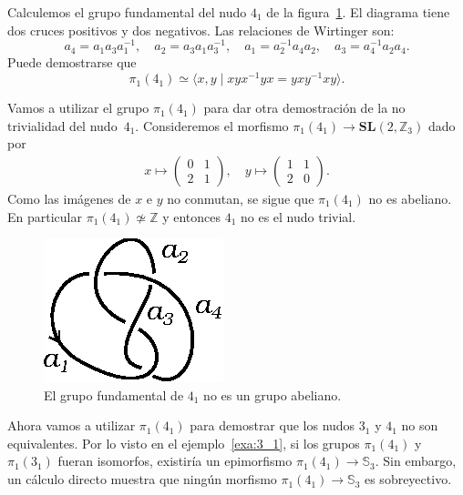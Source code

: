 \documentclass[graybox]{svmult}
\newcommand{\Z}{\mathbb{Z}}
\newcommand{\SL}{\mathbf{SL}}
\newcommand{\Sym}{\mathbb{S}}
\begin{document}
\begin{example}
	\label{exa:4_1}
    Calculemos el grupo fundamental del nudo $4_1$ de la figura~\ref{fig:4_1}.
	El diagrama tiene dos cruces positivos y dos negativos. Las
	relaciones de Wirtinger son:
    \[
        a_4=a_1a_3a_1^{-1},\quad
        a_2=a_3a_1a_3^{-1},\quad
        a_1=a_2^{-1}a_4a_2,\quad           
        a_3=a_4^{-1}a_2a_4.
    \] 
    Puede demostrarse que 
    \[
    \pi_1(4_1)\simeq\langle x,y\mid xyx^{-1}yx=yxy^{-1}xy\rangle.
    \]

    Vamos a utilizar el grupo $\pi_1(4_1)$ para dar otra demostración de la no
    trivialidad del nudo~$4_1$. Consideremos el morfismo
    $\pi_1(4_1)\to\SL(2,\Z_3)$ dado por 
    \begin{align*}
        x\mapsto\begin{pmatrix}
            0 & 1\\
            2 & 1
        \end{pmatrix},\quad
        y\mapsto\begin{pmatrix}
            1 & 1\\
            2 & 0
        \end{pmatrix}.
    \end{align*}
    Como las imágenes de $x$ e $y$ no conmutan, se sigue que $\pi_1(4_1)$ no es
    abeliano. En particular $\pi_1(4_1)\not\simeq\Z$ y entonces $4_1$ no es el
    nudo trivial.
\end{example}

\begin{figure}[ht]
	\centering
	\includegraphics[scale=0.7]{images/4_1}
	\caption{El grupo fundamental de $4_1$ no es un grupo abeliano.}
	\label{fig:4_1}
\end{figure}

\begin{example}
    Ahora vamos a utilizar $\pi_1(4_1)$ para demostrar que los nudos $3_1$ y
    $4_1$ no son equivalentes.  Por lo visto en el ejemplo~\ref{exa:3_1}, si
    los grupos $\pi_1(4_1)$ y $\pi_1(3_1)$ fueran isomorfos, existiría un
    epimorfismo $\pi_1(4_1)\to\Sym_3$. Sin embargo, un cálculo directo muestra
    que ningún morfismo $\pi_1(4_1)\to\Sym_3$ es sobreyectivo.
\end{example}
\end{document}
